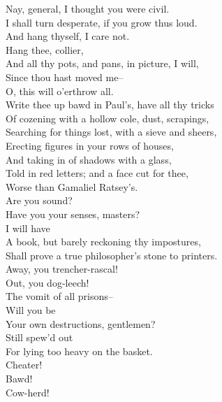 \documentclass{memoir}
\begin{document}
\begin{drama*}
\dolspeaks {} Nay, general, I thought you were civil.\\
\facespeaks  I shall turn desperate, if you grow thus loud.\\
\subtlespeaks  And hang thyself, I care not.\\
\facespeaks {} Hang thee, collier,\\
 And all thy pots, and pans, in picture, I will,\\
 Since thou hast moved me--\\
\dolspeaks {} O, this will o'erthrow all.\\
\facespeaks  Write thee up bawd in Paul's, have all thy tricks\\
 Of cozening with a hollow cole, dust, scrapings,\\
 Searching for things lost, with a sieve and sheers,\\
 Erecting figures in your rows of houses,\\
 And taking in of shadows with a glass,\\
 Told in red letters; and a face cut for thee,\\
 Worse than Gamaliel Ratsey's.\\
\dolspeaks {} Are you sound?\\
 Have you your senses, masters?\\
\facespeaks {} I will have\\
 A book, but barely reckoning thy impostures,\\
 Shall prove a true philosopher's stone to printers.\\
\subtlespeaks  Away, you trencher-rascal!\\
\facespeaks {} Out, you dog-leech!\\
 The vomit of all prisons--\\
\dolspeaks {} Will you be\\
 Your own destructions, gentlemen?\\
\facespeaks {} Still spew'd out\\
 For lying too heavy on the basket.\\
\subtlespeaks  Cheater!\\
\facespeaks {} Bawd!\\
\subtlespeaks {} Cow-herd!\\

\end{drama*}
\end{document}

